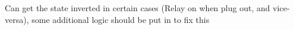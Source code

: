 
\begin{DoxyRefList}
\end{DoxyRefList}

\label{bug__bug000001}%
%
Can get the state inverted in certain cases (Relay on when plug out, and vice-\/versa), some additional logic should be put in to fix this 